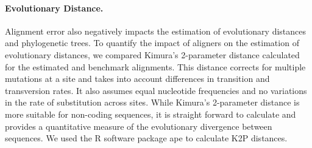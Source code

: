 \documentclass[12pt,letterpaper]{article}
\begin{document}

\paragraph{Evolutionary Distance.}
Alignment error also negatively impacts the estimation of evolutionary distances and phylogenetic trees. To quantify the impact of aligners on the estimation of evolutionary distances, we compared Kimura's 2-parameter distance \citep[K2P;][]{kimura1980simple} calculated for the estimated and benchmark alignments. This distance corrects for multiple mutations at a site and takes into account differences in transition and transversion rates. It also assumes equal nucleotide frequencies and no variations in the rate of substitution across sites. While Kimura's 2-parameter distance is more suitable for non-coding sequences, it is straight forward to calculate and provides a quantitative measure of the evolutionary divergence between sequences. We used the R software package ape \citep{paradis2019ape} to calculate K2P distances.

\end{document}
